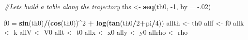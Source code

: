 \documentclass[
]{article}
\newenvironment{Shaded}{\begin{snugshade}}{\end{snugshade}}
\newcommand{\CommentTok}[1]{\textcolor[rgb]{0.56,0.35,0.01}{\textit{#1}}}
\newcommand{\DataTypeTok}[1]{\textcolor[rgb]{0.13,0.29,0.53}{#1}}
\newcommand{\DecValTok}[1]{\textcolor[rgb]{0.00,0.00,0.81}{#1}}
\newcommand{\FloatTok}[1]{\textcolor[rgb]{0.00,0.00,0.81}{#1}}
\newcommand{\KeywordTok}[1]{\textcolor[rgb]{0.13,0.29,0.53}{\textbf{#1}}}
\newcommand{\NormalTok}[1]{#1}
\newcommand{\OperatorTok}[1]{\textcolor[rgb]{0.81,0.36,0.00}{\textbf{#1}}}
\newcommand{\StringTok}[1]{\textcolor[rgb]{0.31,0.60,0.02}{#1}}
\begin{document}
\begin{Shaded}
\begin{Highlighting}[]
\CommentTok{#Lets build a table along the trajectory}
\NormalTok{ths <-}\StringTok{ }\KeywordTok{seq}\NormalTok{(th0, }\DecValTok{-1}\NormalTok{, }\DataTypeTok{by =} \FloatTok{-.02}\NormalTok{)}

\NormalTok{f0 =}\StringTok{ }\KeywordTok{sin}\NormalTok{(th0)}\OperatorTok{/}\NormalTok{(}\KeywordTok{cos}\NormalTok{(th0))}\OperatorTok{^}\DecValTok{2} \OperatorTok{+}\StringTok{ }\KeywordTok{log}\NormalTok{(}\KeywordTok{tan}\NormalTok{(th0}\OperatorTok{/}\DecValTok{2}\OperatorTok{+}\NormalTok{pi}\OperatorTok{/}\DecValTok{4}\NormalTok{))}
\NormalTok{allth <-}\StringTok{ }\NormalTok{th0}
\NormalTok{allf <-}\StringTok{ }\NormalTok{f0}
\NormalTok{allk <-}\StringTok{ }\NormalTok{k}
\NormalTok{allV <-}\StringTok{ }\NormalTok{V0}
\NormalTok{allt <-}\StringTok{ }\NormalTok{t0}
\NormalTok{allx <-}\StringTok{ }\NormalTok{x0}
\NormalTok{ally <-}\StringTok{ }\NormalTok{y0}
\NormalTok{allrho <-}\StringTok{ }\NormalTok{rho}



\end{Highlighting}
\end{Shaded}
\end{document}
